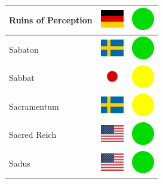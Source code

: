 \documentclass[12pt, a4paper, twoside]{report}
\begin{document}
\begin{center}
\begin{longtable}{|p{5cm}|p{2cm}|p{2cm}|}
 Ruins of Perception                                        & \includegraphics[width=1cm]{../img/flags/de} &   \includegraphics[width=1cm]{../likes/y} \\ \hline
 Sabaton                                                    & \includegraphics[width=1cm]{../img/flags/se} &   \includegraphics[width=1cm]{../likes/y} \\ \hline
 Sabbat                                                     & \includegraphics[width=1cm]{../img/flags/jp} &   \includegraphics[width=1cm]{../likes/m} \\ \hline
 Sacramentum﻿                                                & \includegraphics[width=1cm]{../img/flags/se} &   \includegraphics[width=1cm]{../likes/m} \\ \hline
 Sacred Reich                                               & \includegraphics[width=1cm]{../img/flags/us} &   \includegraphics[width=1cm]{../likes/y} \\ \hline
 Sadus                                                      & \includegraphics[width=1cm]{../img/flags/us} &   \includegraphics[width=1cm]{../likes/y} \\ \hline

\end{longtable}
\end{center}
\end{document}
